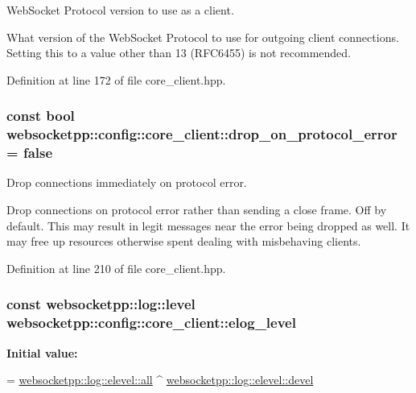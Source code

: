 Web\+Socket Protocol version to use as a client. 

What version of the Web\+Socket Protocol to use for outgoing client connections. Setting this to a value other than 13 (R\+F\+C6455) is not recommended. 

Definition at line 172 of file core\+\_\+client.\+hpp.

\subsubsection[{\texorpdfstring{drop\+\_\+on\+\_\+protocol\+\_\+error}{drop\_on\_protocol\_error}}]{\setlength{\rightskip}{0pt plus 5cm}const bool websocketpp\+::config\+::core\+\_\+client\+::drop\+\_\+on\+\_\+protocol\+\_\+error = false\hspace{0.3cm}{\ttfamily [static]}}\hypertarget{structwebsocketpp_1_1config_1_1core__client_aa43f6d2b983e0d8feb5e0bc1d9ad1be9}{}\label{structwebsocketpp_1_1config_1_1core__client_aa43f6d2b983e0d8feb5e0bc1d9ad1be9}


Drop connections immediately on protocol error. 

Drop connections on protocol error rather than sending a close frame. Off by default. This may result in legit messages near the error being dropped as well. It may free up resources otherwise spent dealing with misbehaving clients. 

Definition at line 210 of file core\+\_\+client.\+hpp.

\subsubsection[{\texorpdfstring{elog\+\_\+level}{elog\_level}}]{\setlength{\rightskip}{0pt plus 5cm}const websocketpp\+::log\+::level websocketpp\+::config\+::core\+\_\+client\+::elog\+\_\+level\hspace{0.3cm}{\ttfamily [static]}}\hypertarget{structwebsocketpp_1_1config_1_1core__client_a653fda222bcedbaff664e60a517d0fa9}{}\label{structwebsocketpp_1_1config_1_1core__client_a653fda222bcedbaff664e60a517d0fa9}
{\bfseries Initial value\+:}
\begin{DoxyCode}
=
        \hyperlink{structwebsocketpp_1_1log_1_1elevel_a9b31ff708c221d314f9f4eb3ff2b1ad7}{websocketpp::log::elevel::all} ^ 
      \hyperlink{structwebsocketpp_1_1log_1_1elevel_a0b1dbc650c6f2711522c096496423726}{websocketpp::log::elevel::devel}
\end{DoxyCode}


